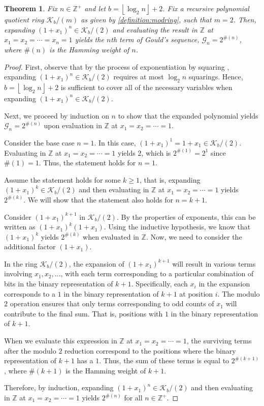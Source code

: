 \documentclass[12pt,reqno]{article}
\theoremstyle{plain}
\newtheorem{theorem}{Theorem}
\newcommand{\floor}[1]{\left\lfloor #1 \right\rfloor}
\newcommand{\Z}{\mathbb{Z}}
\newcommand{\K}{\mathcal{K}}
\newcommand{\wt}[1]{\#(#1)}
\newcommand{\Goulds}{\mathcal{G}}
\begin{document}
\begin{theorem}
\label{theorem:goulds}
Fix $n \in \Z^+$ and let $b={\floor{\log_2 n}+2}$. Fix a recursive polynomial quotient ring $\K_b/(m)$ as given by \cref{definition:modring}, such that $m=2$. Then, expanding $(1+x_1)^n \in \K_b/(2)$ and evaluating the result in $\Z$ at $x_1=x_2=\cdots=x_n=1$ yields the $n$th term of Gould's sequence, $\Goulds_n = 2^{\wt{n}}$, where $\wt{n}$ is the Hamming weight of $n$.
\end{theorem}
\begin{proof}
First, observe that by the process of exponentiation by squaring \cite{knuth1997art}, expanding $(1+x_1)^n \in \K_b/(2)$ requires at most $\log_2 n$ squarings. Hence, $b={\floor{\log_2 n}+2}$ is sufficient to cover all of the necessary variables when expanding $(1+x_1)^n \in \K_b/(2)$.

Next, we proceed by induction on $n$ to show that the expanded polynomial yields $\Goulds_n = 2^{\wt{n}}$ upon evaluation in $\Z$ at $x_1=x_2=\cdots=1$.

Consider the base case $n = 1$. In this case, $(1+x_1)^1 = 1 + x_1 \in \K_b/(2)$. Evaluating in $\Z$ at $x_1=x_2=\cdots=1$ yields $2$, which is $2^{\wt{1}} = 2^1$ since $\wt{1} = 1$. Thus, the statement holds for $n = 1$.

Assume the statement holds for some $k \geq 1$, that is, expanding $(1+x_1)^k \in \K_b/(2)$ and then evaluating in $\Z$ at $x_1=x_2=\cdots=1$ yields $2^{\wt{k}}$. We will show that the statement also holds for $n = k+1$.

Consider $(1+x_1)^{k+1}$ in $\K_b/(2)$. By the properties of exponents, this can be written as $(1+x_1)^k (1+x_1)$. Using the inductive hypothesis, we know that $(1+x_1)^k$ yields $2^{\wt{k}}$ when evaluated in $\Z$. Now, we need to consider the additional factor $(1+x_1)$.

In the ring $\K_b/(2)$, the expansion of $(1+x_1)^{k+1}$ will result in various terms involving $x_1, x_2, \ldots$, with each term corresponding to a particular combination of bits in the binary representation of $k+1$. Specifically, each $x_i$ in the expansion corresponds to a $1$ in the binary representation of $k+1$ at position $i$. The modulo $2$ operation ensures that only terms corresponding to odd counts of $x_1$ will contribute to the final sum. That is, positions with $1$ in the binary representation of $k+1$.

When we evaluate this expression in $\Z$ at $x_1=x_2=\cdots=1$, the surviving terms after the modulo $2$ reduction correspond to the positions where the binary representation of $k+1$ has a $1$. Thus, the sum of these terms is equal to $2^{\wt{k+1}}$, where $\wt{k+1}$ is the Hamming weight of $k+1$.

Therefore, by induction, expanding $(1+x_1)^n \in \K_b/(2)$ and then evaluating in $\Z$ at $x_1=x_2=\cdots=1$ yields $2^{\wt{n}}$ for all $n \in \Z^+$.
\end{proof}
\end{document}
